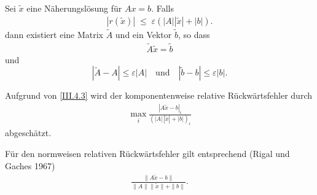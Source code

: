 \begin{Satze}\label{3.4.1}
  Sei $\tilde{ x}$ eine Näherungslösung für 
  $  A  x =  b$. 
  Falls
  \begin{gather}\label{III.4.3}
    |  r(\tilde { x})|  \; \leq \; \varepsilon ( | A| | \tilde { x} | + |  b|).
  \end{gather}
  dann existiert eine Matrix $\tilde{ A}$  und ein
  Vektor $\tilde { b}$, so dass
  \begin{gather*}
    \tilde{ A} \tilde { x}  =  \tilde{ b} 
  \end{gather*}
  und
  \begin{equation}
    |\tilde{ A} -  A |  \leq  \varepsilon | A|
    \quad \textrm{und} \quad | \tilde{ b} -  b| \leq
    \varepsilon | b|.
    \label{III.4.4}
  \end{equation}
  
  Aufgrund von \eqref{III.4.3} wird der komponentenweise relative
  Rückwärtsfehler durch 
  \begin{gather*}
    \max_i \frac{|  A \tilde{ x} -  b|_i}
    { (| A|\, |\tilde{ x}| + | b|)_i} 
  \end{gather*}
  abgeschätzt.
  
  Für den normweisen relativen Rückwärtsfehler gilt entsprechend
  (Rigal und Gaches 1967)
  \begin{gather*}
    \frac{\|  A \tilde{ x} -  b\|}
    { \| A\| \|\tilde{ x} \| + \| b\| } .
  \end{gather*}
\end{Satze}
